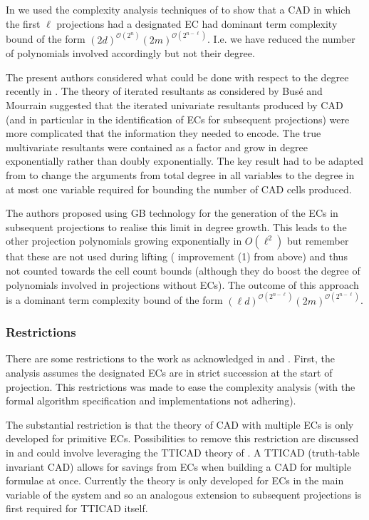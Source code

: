 \documentclass{llncs}
\begin{document}
In \cite[Section 5]{EBD15} we used the complexity analysis techniques of \cite{BDEMW16} to show that a CAD in which the first $\ell$ projections had a designated EC had dominant term complexity bound of the form $(2d)^{\mathcal{O}(2^{n})}(2m)^{\mathcal{O}(2^{n-\ell})}$.  I.e. we have reduced the number of polynomials involved accordingly but not their degree.

The present authors considered what could be done with respect to the degree recently in \cite{ED16}.  The theory of iterated resultants as considered by Bus\'{e} and Mourrain \cite{BM09} suggested that the iterated univariate resultants produced by CAD (and in particular in the identification of ECs for subsequent projections) were more complicated that the information they needed to encode.  The true multivariate resultants were contained as a factor and grow in degree exponentially rather than doubly exponentially.  The key result had to be adapted from \cite{BM09} to change the arguments from total degree in all variables to the degree in at most one variable required for bounding the number of CAD cells produced.

The authors proposed using GB technology for the generation of the ECs in subsequent projections to realise this limit in degree growth.  This leads to the other projection polynomials growing exponentially in $O(\ell^2)$ but remember that these are not used during lifting (\cite{EBD15} improvement (1) from above) and thus not counted towards the cell count bounds (although they do boost the degree of polynomials involved in projections without ECs).  The outcome of this approach is a dominant term complexity bound of the form 
$(\ell d)^{\mathcal{O}(2^{n-\ell})}(2m)^{\mathcal{O}(2^{n-\ell})}$.

\subsubsection*{Restrictions}  There are some restrictions to the work as acknowledged in \cite{EBD15} and \cite{ED16}.  First, the analysis assumes the designated ECs are in strict succession at the start of projection.  This restrictions was made to ease the complexity analysis (with the formal algorithm specification and implementations not adhering).  

The substantial  restriction is that the theory of CAD with multiple ECs is only developed for primitive ECs.  Possibilities to remove this restriction are discussed in \cite{EBD15} and could involve leveraging the TTICAD theory of \cite{BDEMW13} \cite{BDEMW16}.  A TTICAD (truth-table invariant CAD) allows for savings from ECs when building a CAD for multiple formulae at once.  Currently the theory is only developed for ECs in the main variable of the system and so an analogous extension to subsequent projections is first required for TTICAD itself.
\end{document}

